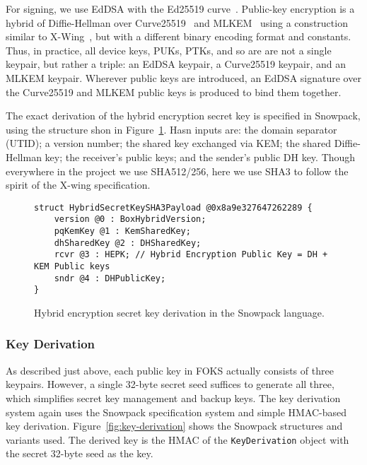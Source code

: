 For signing, we use EdDSA with the Ed25519 curve~\cite{eddsa}.  Public-key
encryption is a hybrid of Diffie-Hellman over
Curve25519~\cite{cryptoeprint:2011/368} and MLKEM~\cite{nist-fips-203} using a
construction similar to X-Wing~\cite{xwing}, but with a different binary
encoding format and constants. Thus, in practice, all device keys, PUKs,
PTKs, and so are are not a single keypair, but rather a triple: an EdDSA 
keypair, a Curve25519 keypair, and an MLKEM keypair. Wherever public keys
are introduced, an EdDSA signature over the Curve25519 and MLKEM public keys
is produced to bind them together.

The exact derivation of the hybrid encryption secret key is specified in 
Snowpack, using the structure shon in Figure~\ref{fig:xwing}. Hasn inputs are:
the domain separator (UTID); a version number; the shared key exchanged via KEM;
the shared Diffie-Hellman key; the receiver's public keys; and the sender's
public DH key. Though everywhere in the project we use SHA512/256, here we 
use SHA3 to follow the spirit of the X-wing specification.

\begin{figure}[ht]
  \centering
  \begin{verbatim}
struct HybridSecretKeySHA3Payload @0x8a9e327647262289 {
    version @0 : BoxHybridVersion;
    pqKemKey @1 : KemSharedKey;
    dhSharedKey @2 : DHSharedKey; 
    rcvr @3 : HEPK; // Hybrid Encryption Public Key = DH + KEM Public keys
    sndr @4 : DHPublicKey;
}
  \end{verbatim}
  \caption{Hybrid encryption secret key derivation in the Snowpack language.}
  \label{fig:xwing}
\end{figure}

\subsubsection{Key Derivation}
\label{sec:xwing-key-derivation}

As described just above, each public key in FOKS actually consists of three keypairs. However,
a single 32-byte secret seed suffices to generate all three, which simplifies secret key
management and backup keys.  The key derivation system again uses the Snowpack specification
system and simple HMAC-based key derivation. Figure~\ref{fig:key-derivation} shows the 
Snowpack structures and variants used. The derived key is the HMAC of the \texttt{KeyDerivation} object
with the secret 32-byte seed as the key.

